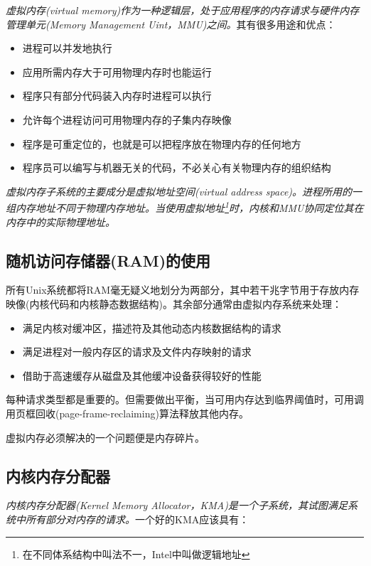     \emph{虚拟内存(virtual memory)作为一种逻辑层，处于应用程序的内存请求与硬件内存管理单元(Memory Management Uint，MMU)之间。}其有很多用途和优点：

\begin{itemize}
    \item 进程可以并发地执行
    \item 应用所需内存大于可用物理内存时也能运行
    \item 程序只有部分代码装入内存时进程可以执行
    \item 允许每个进程访问可用物理内存的子集内存映像
    \item 程序是可重定位的，也就是可以把程序放在物理内存的任何地方
    \item 程序员可以编写与机器无关的代码，不必关心有关物理内存的组织结构
\end{itemize}

    \emph{虚拟内存子系统的主要成分是虚拟地址空间(virtual address space)。进程所用的一组内存地址不同于物理内存地址。当使用虚拟地址\footnote[1]{在不同体系结构中叫法不一，Intel中叫做逻辑地址}时，内核和MMU协同定位其在内存中的实际物理地址。}

\subsection{随机访问存储器(RAM)的使用}

    所有Unix系统都将RAM毫无疑义地划分为两部分，其中若干兆字节用于存放内存映像(内核代码和内核静态数据结构)。其余部分通常由虚拟内存系统来处理：

\begin{itemize}
    \item 满足内核对缓冲区，描述符及其他动态内核数据结构的请求
    \item 满足进程对一般内存区的请求及文件内存映射的请求
    \item 借助于高速缓存从磁盘及其他缓冲设备获得较好的性能
\end{itemize}

    每种请求类型都是重要的。但需要做出平衡，当可用内存达到临界阈值时，可用调用页框回收(page-frame-reclaiming)算法释放其他内存。

    虚拟内存必须解决的一个问题便是内存碎片。

\subsection{内核内存分配器}

    \emph{内核内存分配器(Kernel Memory Allocator，KMA)是一个子系统，其试图满足系统中所有部分对内存的请求。}一个好的KMA应该具有：

